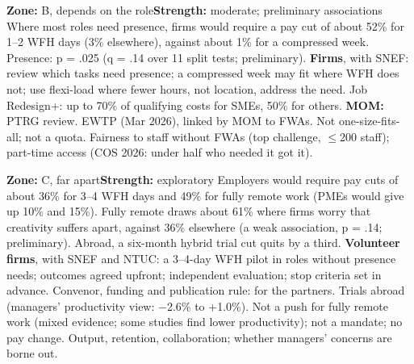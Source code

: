   {\textbf{Zone:} B, depends on the role\quad\textbf{Strength:} moderate; preliminary associations}
  {%
   Where most roles need presence, firms would require a pay cut of about 52\% for 1--2 WFH days (3\% elsewhere), against about 1\% for a compressed week. Presence: p = .025 (q = .14 over 11 split tests; preliminary).}
  {%
   \textbf{Firms}, with SNEF: review which tasks need presence; a compressed week may fit where WFH does not; use flexi-load where fewer hours, not location, address the need. Job Redesign+: up to 70\% of qualifying costs for SMEs, 50\% for others. \textbf{MOM:} PTRG review.}
  {%
   EWTP (Mar 2026), linked by MOM to FWAs.}
  {Not one-size-fits-all; not a quota.}
  {%
   Fairness to staff without FWAs (top challenge, $\le$200 staff); part-time access (COS 2026: under half who needed it got it).}
  {%
   }

  {\textbf{Zone:} C, far apart\quad\textbf{Strength:} exploratory}
  {
   Employers would require pay cuts of about 36\% for 3--4 WFH days and 49\% for fully remote work (PMEs would give up 10\% and 15\%). Fully remote draws about 61\% where firms worry that creativity suffers apart, against 36\% elsewhere (a weak association, p = .14; preliminary). Abroad, a six-month hybrid trial cut quits by a third.}
  {%
   \textbf{Volunteer firms}, with SNEF and NTUC: a 3--4-day WFH pilot in roles without presence needs; outcomes agreed upfront; independent evaluation; stop criteria set in advance. Convenor, funding and publication rule: for the partners.}
  {%
   Trials abroad (managers' productivity view: $-$2.6\% to +1.0\%).}
  {%
   Not a push for fully remote work (mixed evidence; some studies find lower productivity); not a mandate; no pay change.}
  {Output, retention, collaboration; whether managers' concerns are borne out.}
  {%
   }

